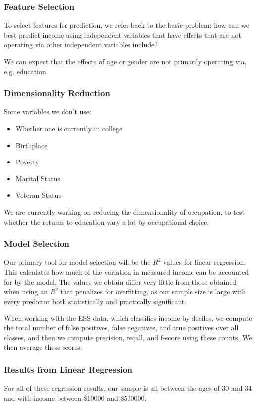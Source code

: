 \documentclass{beamer}
\let\olditem=\item
\renewcommand{\item}{\olditem \justifying}
\begin{document}
\frame %
{
  \frametitle{Feature Selection}
  To select features for prediction, we refer back to the basic problem: how can we best predict income using independent variables that have effects that are not operating via other independent variables include?
  
  We can expect that the effects of age or gender are not primarily operating via, e.g. education. 
  
  
  
}


\frame %
{
  \frametitle{Dimensionality Reduction}
  

Some variables we don't use:
\begin{itemize}
\item Whether one is currently in college
\item Birthplace 
\item Poverty 
\item Marital Status
\item Veteran Status
\end{itemize}

  We are currently working on reducing the dimensionality of occupation, to test whether the returns to education vary a lot by occupational choice.
 
  
  }
  

  

  



\frame %
{
  \frametitle{Model Selection}
Our primary tool for model selection will be the $R^2$ values for linear regression. This calculates how much of the variation in measured income can be accounted for by the model. The values we obtain differ very little from those obtained when using an $R^2$ that penalizes for overfitting, as our sample size is large with every predictor both statistically and practically significant.
\vspace{48pt}


When working with the ESS data, which classifies income by deciles, we compute the total number of false positives, false negatives, and true positives over all classes, and then we compute precision, recall, and f-score using these counts. We then average these scores.   


  
  
  }
  
  \frame %
  {
  \frametitle{Results from Linear Regression}
  \begin{Large}
  
  \end{Large}

\vspace{12pt}

  For all of these regression results, our sample is all between the ages of 30 and 34 and with income between \$10000 and \$500000.
  
  }
  
\end{document}
